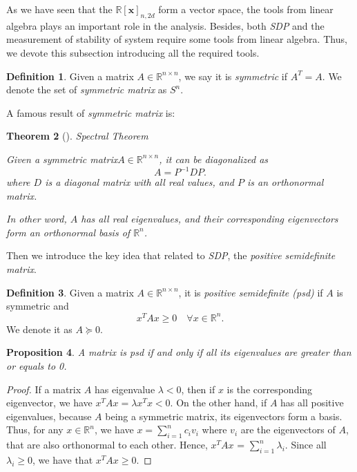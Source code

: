 \documentclass[12pt]{amsart}
\numberwithin{equation}{section}
\newtheorem{thm}{Theorem}
\newtheorem{prop}[thm]{Proposition}
\theoremstyle{definition}
\newtheorem{definition}[thm]{Definition}
\numberwithin{thm}{section}
\begin{document}
As we have seen that the $\mathbb{R}[\mathbf{x}]_{n, 2d}$ form a vector space, the tools from linear algebra plays an important role in the analysis. 
Besides, both \emph{SDP} and the measurement of stability of system require some tools from linear algebra. 
Thus, we devote this subsection introducing all the required tools. 

\begin{definition}
     Given a matrix $A \in \mathbb{R}^{n \times n}$, we say it is \emph{symmetric} if $A^T = A$. We denote the set of \emph{symmetric matrix} as $S^n$.  
\end{definition}

A famous result of \emph{symmetric matrix} is:
\begin{thm} [\cite{golub1996matrix}] Spectral Theorem

     Given a symmetric matrix$A \in \mathbb{R}^{n \times n}$, it can be diagonalized as \begin{equation*} A = P^{-1}DP. \end{equation*} where $D$ is a diagonal matrix with all real values, and $P$ is an orthonormal matrix.
     
     In other word, $A$ has all real eigenvalues, and their corresponding eigenvectors form an orthonormal basis of $\mathbb{R}^n$. 
\end{thm} 

\smallskip

Then we introduce the key idea that related to \emph{SDP}, the \emph{positive semidefinite matrix}.

\begin{definition}
     Given a matrix $A \in \mathbb{R}^{n \times n}$, it is \emph{positive semidefinite (psd)} if $A$ is symmetric and \begin{equation*}
          x^T A x \geq 0 \quad \forall x \in \mathbb{R}^n.
     \end{equation*}
     We denote it as $A \succcurlyeq 0$.
\end{definition}

\begin{prop}
     A matrix is psd if and only if all its eigenvalues are greater than or equals to 0.
\end{prop}

\begin{proof}
     If a matrix $A$ has eigenvalue $\lambda < 0$, then if $x$ is the corresponding eigenvector, we have $x^T A x = \lambda x^T x < 0$.
     On the other hand, if $A$ has all positive eigenvalues, because $A$ being a symmetric matrix, 
     its eigenvectors form a basis. Thus, for any $x \in \mathbb{R}^n$, we have
     $x = \sum_{i = 1} ^ n c_i v_i $ where $v_i$ are the eigenvectors of $A$, that are also orthonormal to each other.
     Hence, $x^T A x$ = $\sum_{i = 1} ^ n \lambda_i$. Since all $\lambda_i \geq 0$, we have that $x ^ T A x \geq 0$.
\end{proof}
\end{document}
